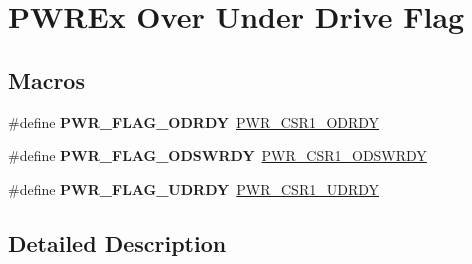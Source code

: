 \hypertarget{group___p_w_r_ex___over___under___drive___flag}{}\section{P\+W\+R\+Ex Over Under Drive Flag}
\label{group___p_w_r_ex___over___under___drive___flag}
\subsection*{Macros}
\begin{DoxyCompactItemize}
\item 
\mbox{\label{group___p_w_r_ex___over___under___drive___flag_ga06e6f676b98662bb8a707b43f3505a93}} 
\#define {\bfseries P\+W\+R\+\_\+\+F\+L\+A\+G\+\_\+\+O\+D\+R\+DY}~\mbox{\hyperlink{group___peripheral___registers___bits___definition_gaf3b7be10191e6bc802d4162c62dc8468}{P\+W\+R\+\_\+\+C\+S\+R1\+\_\+\+O\+D\+R\+DY}}
\item 
\mbox{\label{group___p_w_r_ex___over___under___drive___flag_ga69becd2046640bb5616a10b183c6876c}} 
\#define {\bfseries P\+W\+R\+\_\+\+F\+L\+A\+G\+\_\+\+O\+D\+S\+W\+R\+DY}~\mbox{\hyperlink{group___peripheral___registers___bits___definition_gaa4a09d4af8e3a928f7ff8a681c936a0a}{P\+W\+R\+\_\+\+C\+S\+R1\+\_\+\+O\+D\+S\+W\+R\+DY}}
\item 
\mbox{\label{group___p_w_r_ex___over___under___drive___flag_ga9f3b9b846acf34e8a18af7bcf81d8c79}} 
\#define {\bfseries P\+W\+R\+\_\+\+F\+L\+A\+G\+\_\+\+U\+D\+R\+DY}~\mbox{\hyperlink{group___peripheral___registers___bits___definition_gaa6ab041a43cb6409a0fad59c5d0df631}{P\+W\+R\+\_\+\+C\+S\+R1\+\_\+\+U\+D\+R\+DY}}
\end{DoxyCompactItemize}


\subsection{Detailed Description}
